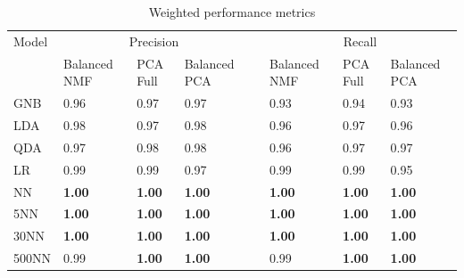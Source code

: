 \documentclass{article}
\begin{document}
\squeezetable
\begin{table}
\caption {\label{tab:performance} Weighted performance metrics} 
\begin{ruledtabular}
\begin{tabular}{llllllll}
 Model & \multicolumn{3}{c}{Precision} &  & \multicolumn{3}{c}{Recall}    \\ 
\cline{2-4} \cline{6-8} 
        & Balanced NMF   & PCA Full   &  Balanced PCA                                             &             
	&  Balanced NMF  & PCA Full   & Balanced PCA                                                 \\    \hline
 GNB   & 0.96   & 0.97 & 0.97  &         %
       & 0.93   & 0.94 & 0.93 \\         %
 LDA   & 0.98   & 0.97 & 0.98 &          %
       & 0.96   & 0.97 & 0.96\\          %
 QDA   & 0.97   & 0.98 & 0.98 &         %
       & 0.96   & 0.97 & 0.97\\         %
 LR & 0.99 & 0.99 & 0.97 &               %
    & 0.99 & 0.99 & 0.95    \\           %
 NN & \textbf{1.00}    & \textbf{1.00}   & \textbf{1.00}    &       %
    & \textbf{1.00}   & \textbf{1.00}    & \textbf{1.00}    \\      %
 5NN & \textbf{1.00}    & \textbf{1.00}    & \textbf{1.00}  &       %
     & \textbf{1.00}  & \textbf{1.00}    & \textbf{1.00}    \\      %
 30NN   & \textbf{1.00} & \textbf{1.00}    & \textbf{1.00}  &       %
    & \textbf{1.00}   & \textbf{1.00}    & \textbf{1.00}    \\      %
 500NN  & 0.99 & \textbf{1.00}    & \textbf{1.00}  &       %
    & 0.99   & \textbf{1.00}   & \textbf{1.00} \\          %

\end{tabular}
\end{ruledtabular}
\begin{tabbing}
\end{tabbing}
\end{table}

\end{document}
